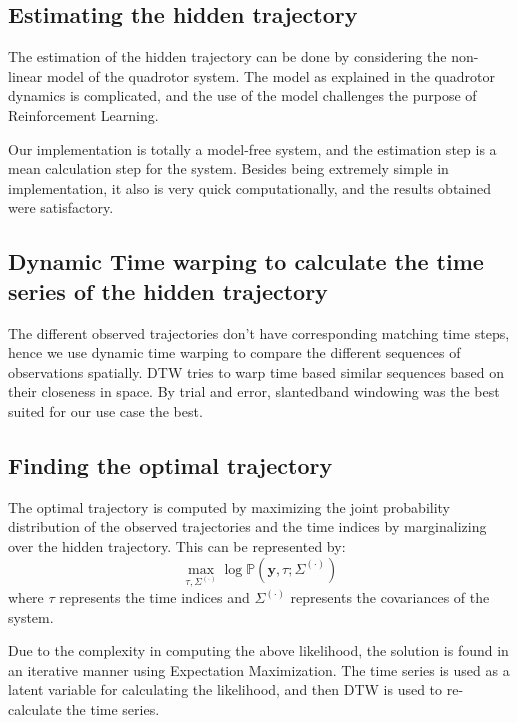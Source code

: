 \documentclass[hidelinks,BTech]{iitmdiss}
\begin{document}
\subsection{Estimating the hidden trajectory}
The estimation of the hidden trajectory can be done by considering the non-linear model of the quadrotor system. The model as explained in the quadrotor dynamics is complicated, and the use of the model challenges the purpose of Reinforcement Learning. 

Our implementation is totally a model-free system, and the estimation step is a mean calculation step for the system. Besides being extremely simple in implementation, it also is very quick computationally, and the results obtained were satisfactory.


\subsection{Dynamic Time warping to calculate the time series of the hidden trajectory}
The different observed trajectories don't have corresponding matching time steps, hence we use dynamic time warping to compare the different sequences of observations spatially. DTW tries to warp time based similar sequences based on their closeness in space. By trial and error, slantedband windowing was the best suited for our use case the best. 

\subsection{Finding the optimal trajectory}
The optimal trajectory is computed by maximizing the joint probability distribution of the observed trajectories and the time indices by marginalizing over the hidden trajectory. This can be represented by:
\begin{equation} 
  \max_{\tau, \Sigma^{(\cdot)}} \log \mathbb{P}(\mathbf{y}, \tau ; \Sigma^{(\cdot)})
\end{equation}
where $\tau$ represents the time indices and $\Sigma^{(\cdot)}$ represents the covariances of the system.

Due to the complexity in computing the above likelihood, the solution is found in an iterative manner using Expectation Maximization. The time series is used as a latent variable for calculating the likelihood, and then DTW is used to re-calculate the time series.
\end{document}
